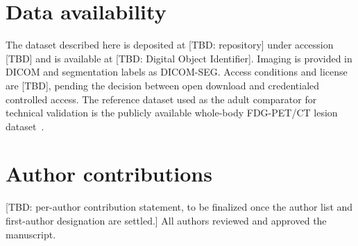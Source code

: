 \documentclass[pdflatex,sn-nature]{sn-jnl}%
\begin{document}










\backmatter


\section*{Data availability}\label{sec:dataavail}
The dataset described here is deposited at [TBD: repository] under accession [TBD] and is available at [TBD: Digital Object Identifier].
Imaging is provided in DICOM and segmentation labels as DICOM-SEG.
Access conditions and license are [TBD], pending the decision between open download and credentialed controlled access.
The reference dataset used as the adult comparator for technical validation is the publicly available whole-body FDG-PET/CT lesion dataset~\cite{Gatidis_2022_data}.






\section*{Author contributions}\label{sec:contrib}
[TBD: per-author contribution statement, to be finalized once the author list and first-author designation are settled.]
All authors reviewed and approved the manuscript.

\end{document}
